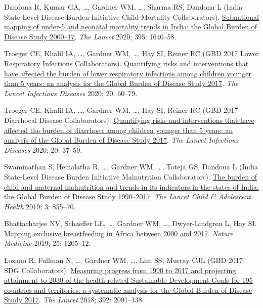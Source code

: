 \documentclass[11pt,article,oneside]{memoir}
\begin{document}
\begin{publist}
\item Dandona R, Kumar GA, \ldots, {\minbold Gardner WM}, \ldots, Sharma RS, Dandona L (India State-Level Disease Burden Initiative Child Mortality Collaborators). \href{https://doi.org/10.1016/S0140-6736(20)30471-2}{Subnational mapping of under-5 and neonatal mortality trends in India: the Global Burden of Disease Study 2000--17}. \emph{The Lancet} 2020; 395: 1640--58.

\item Troeger CE, Khalil IA, \ldots, {\minbold Gardner WM}, \ldots, Hay SI, Reiner RC (GBD 2017 Lower Respiratory Infections Collaborators). \href{https://doi.org/10.1016/S1473-3099(19)30410-4}{Quantifying risks and interventions that have affected the burden of lower respiratory infections among children younger than 5 years: an analysis for the Global Burden of Disease Study 2017}. \emph{The Lancet Infectious Diseases} 2020; 20: 60--79.

\item Troeger CE, Khalil IA, \ldots, {\minbold Gardner WM}, \ldots, Hay SI, Reiner RC (GBD 2017 Diarrhoeal Disease Collaborators). \href{https://doi.org/10.1016/S1473-3099(19)30401-3}{Quantifying risks and interventions that have affected the burden of diarrhoea among children younger than 5 years: an analysis of the Global Burden of Disease Study 2017}. \emph{The Lancet Infectious Diseases} 2020; 20: 37--59.

\item Swaminathan S, Hemalatha R, \ldots, {\minbold Gardner WM}, \ldots, Toteja GS, Dandona L (India State-Level Disease Burden Initiative Malnutrition Collaborators). \href{https://doi.org/10.1016/S2352-4642(19)30273-1}{The burden of child and maternal malnutrition and trends in its indicators in the states of India: the Global Burden of Disease Study 1990--2017}. \emph{The Lancet Child \& Adolescent Health} 2019; 3: 855--70.

\item Bhattacharjee NV, Schaeffer LE, \ldots, {\minbold Gardner WM}, \ldots, Dwyer-Lindgren L, Hay SI. \href{https://doi.org/10.1038/s41591-019-0525-0}{Mapping exclusive breastfeeding in Africa between 2000 and 2017}. \emph{Nature Medicine} 2019; 25: 1205--12.

\item Lozano R, Fullman N, \ldots, {\minbold Gardner WM}, \ldots, Lim SS, Murray CJL (GBD 2017 SDG Collaborators). \href{https://doi.org/10.1016/S0140-6736(18)32281-5}{Measuring progress from 1990 to 2017 and projecting attainment to 2030 of the health-related Sustainable Development Goals for 195 countries and territories: a systematic analysis for the Global Burden of Disease Study 2017}. \emph{The Lancet} 2018; 392: 2091--138.


\end{publist}
\end{document}
